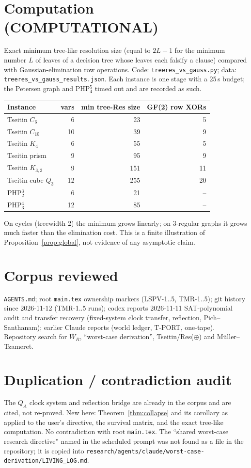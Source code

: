\documentclass[11pt]{article}
\newcommand{\W}{\overline W}
\begin{document}
\section{Computation (COMPUTATIONAL)}
Exact minimum tree-like resolution size (equal to $2L-1$ for the minimum
number $L$ of leaves of a decision tree whose leaves each falsify a clause)
compared with Gaussian-elimination row operations. Code:
\texttt{treeres\_vs\_gauss.py}; data:
\texttt{treeres\_vs\_gauss\_results.json}. Each instance is one stage with a
25\,s budget; the Petersen graph and PHP$^5_4$ timed out and are recorded as
such.
\begin{center}\small
\begin{tabular}{lrrr}
\toprule
Instance & vars & min tree-Res size & GF(2) row XORs\\
\midrule
Tseitin $C_6$ & 6 & 23 & 5\\
Tseitin $C_{10}$ & 10 & 39 & 9\\
Tseitin $K_4$ & 6 & 55 & 5\\
Tseitin prism & 9 & 95 & 9\\
Tseitin $K_{3,3}$ & 9 & 151 & 11\\
Tseitin cube $Q_3$ & 12 & 255 & 20\\
PHP$^3_2$ & 6 & 21 & --\\
PHP$^4_3$ & 12 & 85 & --\\
\bottomrule
\end{tabular}
\end{center}
On cycles (treewidth 2) the minimum grows linearly; on 3-regular graphs it
grows much faster than the elimination cost. This is a finite illustration
of Proposition~\ref{prop:global}, not evidence of any asymptotic claim.

\section*{Corpus reviewed}
\texttt{AGENTS.md}; root \texttt{main.tex} ownership markers (LSPV-1..5,
TMR-1..5); git history since 2026-11-12 (TMR-1..5 runs); codex reports
2026-11-11 SAT-polynomial audit and transfer recovery (fixed-system clock
transfer, reflection, Pich--Santhanam); earlier Claude reports
(world ledger, T-PORT, one-tape). Repository search for $\W_R$,
``worst-case derivation'', Tseitin/Res($\oplus$) and M\"uller--Tzameret.

\section*{Duplication / contradiction audit}
The $Q_A$ clock system and reflection bridge are already in the corpus and
are cited, not re-proved. New here: Theorem~\ref{thm:collapse} and its
corollary as applied to the user's directive, the survival matrix, and the
exact tree-like computation. No contradiction with root \texttt{main.tex}.
The ``shared worst-case research directive'' named in the scheduled prompt
was not found as a file in the repository; it is copied into
\texttt{research/agents/claude/worst-case-derivation/LIVING\_LOG.md}.
\end{document}
